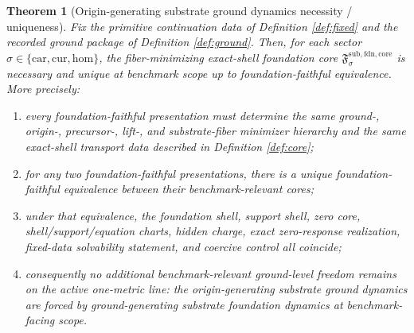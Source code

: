\documentclass[11pt]{article}
\newcommand{\Car}{\mathrm{car}}
\newcommand{\Cur}{\mathrm{cur}}
\newcommand{\Hom}{\mathrm{hom}}
\newcommand{\FoundationCore}{\mathfrak F^{\mathrm{sub,fdn,core}}}
\newtheorem{theorem}{Theorem}
\begin{document}
\begin{theorem}[Origin-generating substrate ground dynamics necessity / uniqueness]
\label{thm:main}
Fix the primitive continuation data of Definition \ref{def:fixed} and the recorded ground package of Definition \ref{def:ground}. Then, for each sector \(\sigma\in\{\Car,\Cur,\Hom\}\), the fiber-minimizing exact-shell foundation core \(\FoundationCore_{\sigma}\) is necessary and unique at benchmark scope up to foundation-faithful equivalence. More precisely:
\begin{enumerate}
    \item every foundation-faithful presentation must determine the same ground-, origin-, precursor-, lift-, and substrate-fiber minimizer hierarchy and the same exact-shell transport data described in Definition \ref{def:core};
    \item for any two foundation-faithful presentations, there is a unique foundation-faithful equivalence between their benchmark-relevant cores;
    \item under that equivalence, the foundation shell, support shell, zero core, shell/support/equation charts, hidden charge, exact zero-response realization, fixed-data solvability statement, and coercive control all coincide;
    \item consequently no additional benchmark-relevant ground-level freedom remains on the active one-metric line: the origin-generating substrate ground dynamics are forced by ground-generating substrate foundation dynamics at benchmark-facing scope.
\end{enumerate}
\end{theorem}
\end{document}
